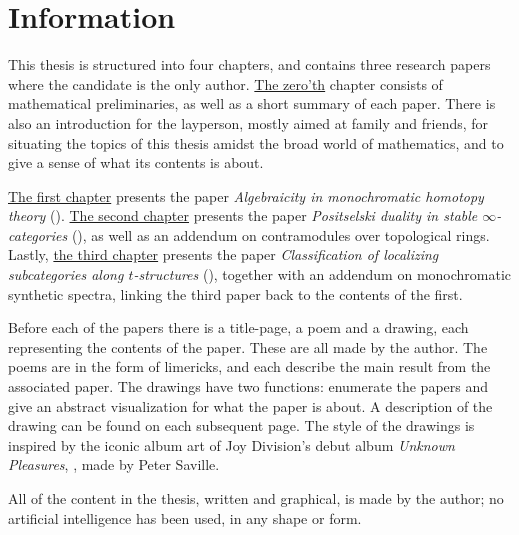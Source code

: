 
\section*{Information}

This thesis is structured into four chapters, and contains three research papers where the candidate is the only author. \hyperref[ch0]{The zero'th} chapter consists of mathematical preliminaries, as well as a short summary of each paper. There is also an introduction for the layperson, mostly aimed at family and friends, for situating the topics of this thesis amidst the broad world of mathematics, and to give a sense of what its contents is about.  

\hyperref[ch1]{The first chapter} presents the paper \emph{Algebraicity in monochromatic homotopy theory} (\cite{aambo_2024_algebraicity}). \hyperref[ch2]{The second chapter} presents the paper \emph{Positselski duality in stable $\infty$-categories} (\cite{aambo_2024_positselski}), as well as an addendum on contramodules over topological rings. Lastly, \hyperref[ch3]{the third chapter} presents the paper \emph{Classification of localizing subcategories along $t$-structures} (\cite{aambo_2024_localizing}), together with an addendum on monochromatic synthetic spectra, linking the third paper back to the contents of the first. 

Before each of the papers there is a title-page, a poem and a drawing, each representing the contents of the paper. These are all made by the author. The poems are in the form of limericks, and each describe the main result from the associated paper. The drawings have two functions: enumerate the papers and give an abstract visualization for what the paper is about. A description of the drawing can be found on each subsequent page. The style of the drawings is inspired by the iconic album art of Joy Division's debut album \emph{Unknown Pleasures}, \cite{joy-division_79}, made by Peter Saville. 

All of the content in the thesis, written and graphical, is made by the author; no artificial intelligence has been used, in any shape or form. 